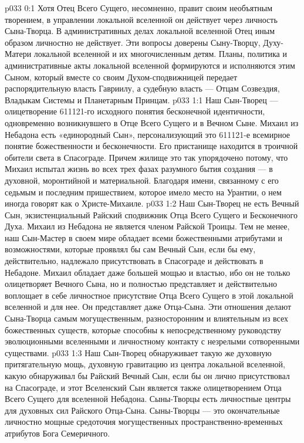 \vs p033 0:1 Хотя Отец Всего Сущего, несомненно, правит своим необъятным творением, в управлении локальной вселенной он действует через личность Сына\hyp{}Творца. В административных делах локальной вселенной Отец иным образом личностно не действует. Эти вопросы доверены Сыну\hyp{}Творцу, Духу\hyp{}Матери локальной вселенной и их многочисленным детям. Планы, политика и административные акты локальной вселенной формируются и исполняются этим Сыном, который вместе со своим Духом\hyp{}сподвижницей передает распорядительную власть Гавриилу, а судебную власть --- Отцам Созвездия, Владыкам Системы и Планетарным Принцам.
\vs p033 1:1 Наш Сын\hyp{}Творец --- олицетворение 611121\hyp{}го исходного понятия бесконечной идентичности, одновременно возникнувшего в Отце Всего Сущего и в Вечном Сыне. Михаил из Небадона есть «единородный Сын», персонализующий это 611121\hyp{}е всемирное понятие божественности и бесконечности. Его пристанище находится в троичной обители света в Спасограде. Причем жилище это так упорядочено потому, что Михаил испытал жизнь во всех трех фазах разумного бытия создания --- в духовной, моронтийной и материальной. Благодаря имени, связанному с его седьмым и последним пришествием, которое имело место на Урантии, о нем иногда говорят как о Христе\hyp{}Михаиле.
\vs p033 1:2 Наш Сын\hyp{}Творец не есть Вечный Сын, экзистенциальный Райский сподвижник Отца Всего Сущего и Бесконечного Духа. Михаил из Небадона не является членом Райской Троицы. Тем не менее, наш Сын\hyp{}Мастер в своем мире обладает всеми божественными атрибутами и возможностями, которые проявлял бы сам Вечный Сын, если бы ему, действительно, надлежало присутствовать в Спасограде и действовать в Небадоне. Михаил обладает даже большей мощью и властью, ибо он не только олицетворяет Вечного Сына, но и полностью представляет и действительно воплощает в себе личностное присутствие Отца Всего Сущего в этой локальной вселенной и для нее. Он представляет даже Отца\hyp{}Сына. Эти отношения делают Сына\hyp{}Творца самым могущественным, разносторонним и влиятельным из всех божественных существ, которые способны к непосредственному руководству эволюционными вселенными и личностному контакту с незрелыми сотворенными существами.
\vs p033 1:3 Наш Сын\hyp{}Творец обнаруживает такую же духовную притягательную мощь, духовную гравитацию из центра локальной вселенной, какую обнаруживал бы Райский Вечный Сын, если бы он лично присутствовал на Спасограде, и  этот Вселенский Сын является также олицетворением Отца Всего Сущего для вселенной Небадона. Сыны\hyp{}Творцы есть личностные центры для духовных сил Райского Отца\hyp{}Сына. Сыны\hyp{}Творцы --- это окончательные личностно мощные средоточия могущественных пространственно\hyp{}временных атрибутов Бога Семеричного.
